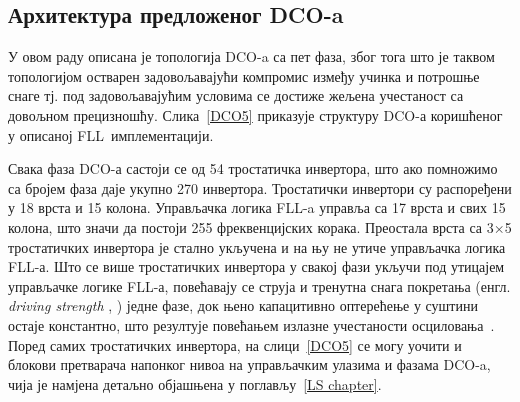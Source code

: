 \documentclass[master]{finthesis}
\makeatletter
\newcommand*{\engl}[2][\@empty]{%
    \edef\theacronym{#1}%
    (енгл. \foreignlanguage{english}{\emph{#2}%
    \ifx\theacronym\@empty \else , #1\fi})%
}
\def \FLL  {FLL} %
\def \DCO  {DCO} %
\makeatother
\begin{document}
\subsection{Архитектура предложеног \DCO-a}
У овом раду описана је топологија \DCO-a са пет фаза, због тога што је таквом топологијом остварен задовољавајући компромис између учинка и потрошње снаге тј. под задовољавајућим условима се достиже жељена учестаност са довољном прецизношћу. Слика~\ref{DCO5} приказује структуру \DCO-а коришћеног у описаној \FLL\ имплементацији. \par

Свака фаза \DCO-а састоји се од 54 тростатичка инвертора, што ако помножимо са бројем фаза даје укупно 270 инвертора. Тростатички инвертори су распоређени у 18 врста и 15 колона. Управљачка логика \FLL-a управља са 17 врста и свих 15 колона, што значи да постоји 255 фреквенцијских корака. Преостала врста са 3$\times$5 тростатичких инвертора је стално укључена и на њу не утиче управљачка логика \FLL-а. Што се више тростатичких инвертора у свакој фази укључи под утицајем управљачке логике \FLL-а, повећавају се струја и тренутна снага покретања \engl{driving strength} једне фазе, док њено капацитивно оптерећење у суштини остаје константно, што резултује повећањем излазне учестаности осциловања~\cite{Tierno:4443210}. Поред самих тростатичких инвертора, на слици~\ref{DCO5} се могу уочити и блокови претварача напонког нивоа на управљачким улазима и фазама \DCO-a, чија је намјена детаљно објашњена у поглављу~\ref{LS chapter}.
\end{document}
